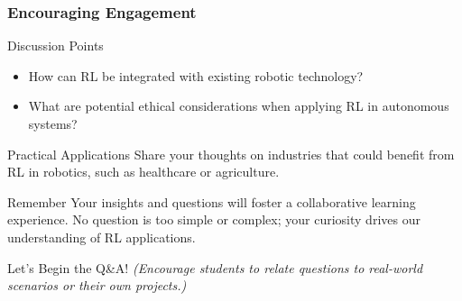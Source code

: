 \documentclass[aspectratio=169]{beamer}
\begin{document}
\begin{frame}[fragile]
  \frametitle{Encouraging Engagement}
  \begin{block}{Discussion Points}
    \begin{itemize}
      \item How can RL be integrated with existing robotic technology?
      \item What are potential ethical considerations when applying RL in autonomous systems?
    \end{itemize}
  \end{block}
  
  \begin{block}{Practical Applications}
    Share your thoughts on industries that could benefit from RL in robotics, such as healthcare or agriculture.
  \end{block}
  
  \begin{block}{Remember}
    Your insights and questions will foster a collaborative learning experience. No question is too simple or complex; your curiosity drives our understanding of RL applications.
  \end{block}
  
  \begin{block}{Let's Begin the Q\&A!}
    \textit{(Encourage students to relate questions to real-world scenarios or their own projects.)}
  \end{block}
\end{frame}
\end{document}
